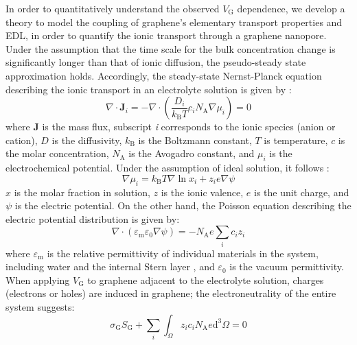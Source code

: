 In order to quantitatively understand the observed $V_{\mathrm{G}}$
dependence, we develop a theory to model the coupling of graphene's
elementary transport properties and EDL, in order to quantify the
ionic transport through a graphene nanopore. Under the assumption that
the time scale for the bulk concentration change is significantly
longer than that of ionic diffusion, the pseudo-steady state
approximation holds. Accordingly, the steady-state Nernst-Planck
equation describing the ionic transport in an electrolyte solution is
given by \cite{MacGillivray_1968_NPE}:
\begin{equation}
  \label{eq:np-pnp}
  \nabla \cdot \boldsymbol{J}_{i} = -\nabla \cdot (\frac{D_{i}}{k_{\mathrm{B}}T} c_{i} N_{\mathrm{A}} \nabla \mu_{i}) = 0
\end{equation}
where $\boldsymbol{J}$ is the mass flux, subscript \textit{i}
corresponds to the ionic species (anion or cation), $D$ is the diffusivity,
$k_{\mathrm{B}}$ is the Boltzmann constant, $T$ is temperature, $c$ is
the molar concentration, $N_{\mathrm{A}}$ is the Avogadro constant,
and $\mu_{i}$ is the electrochemical potential. Under the assumption
of ideal solution, it follows \cite{Kilic_2007_steric_effect_ion}:
\begin{equation}
  \label{eq:np-mu}
  \nabla \mu_{i} = k_{\mathrm{B}} T \nabla \ln x_{i} + z_{i} e \nabla \psi
\end{equation}
 $x$ is the molar fraction in solution, $z$ is the ionic valence,
$e$ is the unit charge, and $\psi$ is the electric potential. On the
other hand, the Poisson equation describing the electric potential
distribution is given by:
\begin{equation}
  \label{eq:np-poisson}
  \nabla \cdot (\varepsilon_{\mathrm{m}} \varepsilon_{0} \nabla \psi)
  =
  - N_{\mathrm{A}} e \sum_{i} c_{i} z_{i}
\end{equation}
where $\varepsilon_{\mathrm{m}}$ is the relative permittivity of
individual materials in the system, including water and the internal
Stern layer , and
$\varepsilon_{0}$ is the vacuum permittivity. When applying
$V_{\mathrm{G}}$ to graphene adjacent to the electrolyte solution,
charges (electrons or holes) are induced in graphene; the
electroneutrality of the entire system suggests:
\begin{equation}
  \label{eq:np-electro-neutral}
  \sigma_{\mathrm{G}} S_{\mathrm{G}} + \sum_{i} \int_{\Omega} z_{i} c_{i} N_{\mathrm{A}} e \mathrm{d}^{3} \Omega= 0
\end{equation}
